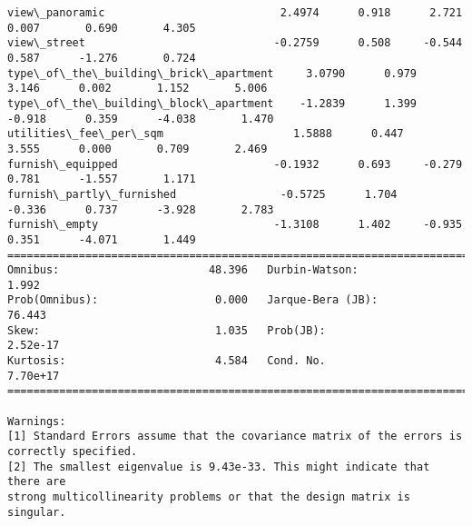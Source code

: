 \documentclass[11pt]{article}
\begin{document}
\begin{Verbatim}[commandchars=\\\{\}]
view\_panoramic                           2.4974      0.918      2.721      0.007       0.690       4.305
view\_street                             -0.2759      0.508     -0.544      0.587      -1.276       0.724
type\_of\_the\_building\_brick\_apartment     3.0790      0.979      3.146      0.002       1.152       5.006
type\_of\_the\_building\_block\_apartment    -1.2839      1.399     -0.918      0.359      -4.038       1.470
utilities\_fee\_per\_sqm                    1.5888      0.447      3.555      0.000       0.709       2.469
furnish\_equipped                        -0.1932      0.693     -0.279      0.781      -1.557       1.171
furnish\_partly\_furnished                -0.5725      1.704     -0.336      0.737      -3.928       2.783
furnish\_empty                           -1.3108      1.402     -0.935      0.351      -4.071       1.449
==============================================================================
Omnibus:                       48.396   Durbin-Watson:                   1.992
Prob(Omnibus):                  0.000   Jarque-Bera (JB):               76.443
Skew:                           1.035   Prob(JB):                     2.52e-17
Kurtosis:                       4.584   Cond. No.                     7.70e+17
==============================================================================

Warnings:
[1] Standard Errors assume that the covariance matrix of the errors is correctly specified.
[2] The smallest eigenvalue is 9.43e-33. This might indicate that there are
strong multicollinearity problems or that the design matrix is singular.

    \end{Verbatim}
\end{document}
